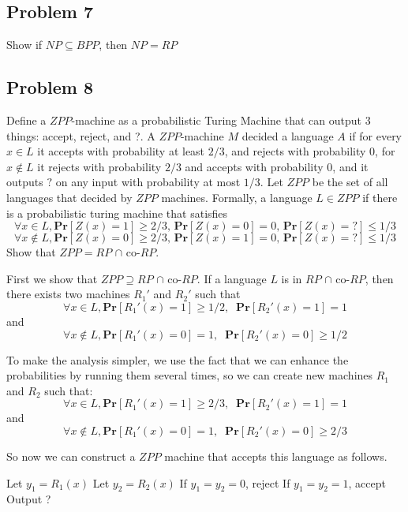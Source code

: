 \documentclass[english]{article}
\begin{document}
\subsection*{Problem 7}
Show if $NP \subseteq BPP$, then $NP = RP$

\subsection*{Problem 8}
Define a $ZPP$-machine as a probabilistic Turing Machine that can output 3 things: accept, reject, and ?.
A $ZPP$-machine $M$ decided a language $A$ if for every $x \in L$ it accepts with probability at least $2/3$, and
rejects with probability 0, for $x \notin L$ it rejects with probability $2/3$ and accepts with probability 0, and it
outputs $?$ on any input with probability at most $1/3$. Let $ZPP$ be the set of all languages that decided by
$ZPP$ machines. Formally, a language $L \in ZPP$ if there is a probabilistic turing machine that satisfies
\[\forall x \in L, \mathbf{Pr}[Z(x) = 1] \ge 2/3,\,\mathbf{Pr}[Z(x) = 0] = 0,\,\mathbf{Pr}[Z(x) = ?] \le 1/3 \]
\[\forall x \notin L, \mathbf{Pr}[Z(x) = 0] \ge 2/3,\,\mathbf{Pr}[Z(x) = 1] = 0,\,\mathbf{Pr}[Z(x) = ?] \le 1/3\]
Show that $ZPP = RP$ $\cap$ co-$RP$.

First we show that $ZPP \supseteq RP$ $\cap$ co-$RP$. 
If a language $L$ is in $RP$ $\cap$ co-$RP$, then there exists two machines $R_1'$ and $R_2'$ such that
\[\forall x \in L, \mathbf{Pr}[R_1'(x) = 1] \ge 1/2, \;\; \mathbf{Pr}[R_2'(x) = 1] = 1\]
and
\[\forall x \notin L, \mathbf{Pr}[R_1'(x) = 0] = 1, \;\; \mathbf{Pr}[R_2'(x) = 0] \ge 1/2\]

To make the analysis simpler, we use the fact that we can enhance the probabilities by running them several times,
so we can create new machines $R_1$ and $R_2$ such that:
\[\forall x \in L, \mathbf{Pr}[R_1'(x) = 1] \ge 2/3, \;\; \mathbf{Pr}[R_2'(x) = 1] = 1\]
and
\[\forall x \notin L, \mathbf{Pr}[R_1'(x) = 0] = 1, \;\; \mathbf{Pr}[R_2'(x) = 0] \ge 2/3\]

So now we can construct a $ZPP$ machine that accepts this language as follows. 
\begin{algorithmic}
  \State Let $y_1 = R_1(x)$
  \State Let $y_2 = R_2(x)$
  \State If $y_1 = y_2 = 0$, reject
  \State If $y_1 = y_2 = 1$, accept
  \State Output ?
\EndFunction 
\end{algorithmic}
\end{document}
